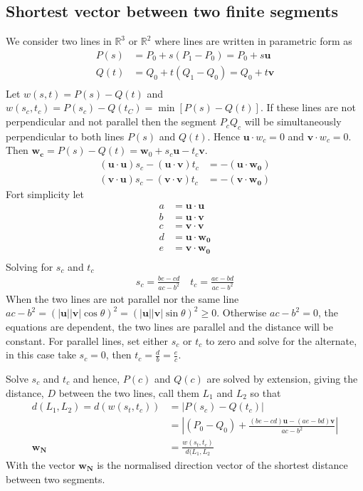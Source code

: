 \subsection{Shortest vector between two finite segments}
We consider two lines in $\mathbb{R}^3$ or $\mathbb{R}^2$ where lines are written in parametric form as
\begin{align}
    P(s) &= P_0+s(P_1-P_0) = P_0 + s\mathbf{u} \\
    Q(t) &= Q_0+t(Q_1-Q_0) = Q_0 + t\mathbf{v} \\
\end{align}
Let $w(s,t)= P(s)-Q(t)$ and $w(s_c,t_c)=P(s_c)-Q(t_C) = \min \left[ P(s)-Q(t) \right]$. If these lines are not perpendicular and not parallel then the segment $P_cQ_c$ will be simultaneously perpendicular to both lines $P(s)$ and $Q(t)$. Hence $\mathbf{u}\cdot w_c = 0$ and $\mathbf{v}\cdot w_c = 0$. Then $\mathbf{w_c} = P(s)-Q(t)=\mathbf{w}_0+s_c\mathbf{u}-t_c\mathbf{v}$. 
\begin{align}
    (\mathbf{u}\cdot\mathbf{u})s_c-(\mathbf{u}\cdot\mathbf{v})t_c &= -(\mathbf{u}\cdot\mathbf{w_0}) \\
    (\mathbf{v}\cdot\mathbf{u})s_c-(\mathbf{v}\cdot\mathbf{v})t_c &= -(\mathbf{v}\cdot\mathbf{w_0})
\end{align}
Fort simplicity let 
\begin{align}
    a & = \mathbf{u}\cdot\mathbf{u} \\
    b & = \mathbf{u}\cdot\mathbf{v} \\
    c & = \mathbf{v}\cdot\mathbf{v} \\
    d & = \mathbf{u}\cdot\mathbf{w_0} \\
    e & = \mathbf{v}\cdot\mathbf{w_0} \\
\end{align}
Solving for $s_c$ and $t_c$
\begin{align}
    s_c = \frac{be-cd}{ac-b^2} \quad t_c = \frac{ae-bd}{ac-b^2} 
\end{align}
When the two lines are not parallel nor the same line $ac-b^2 = \left(|\mathbf{u}||\mathbf{v}|\cos\theta\right)^2 = \left(|\mathbf{u}||\mathbf{v}|\sin\theta\right)^2 \geq 0$. Otherwise $ac-b^2=0$, the equations are dependent, the two lines are parallel and the distance will be constant. For parallel lines, set either $s_c$ or $t_c$ to zero and solve for the alternate, in this case take $s_c=0$, then $t_c = \frac{d}{b}=\frac{e}{c}$. 

Solve $s_c$ and $t_c$ and hence, $P(c)$ and $Q(c)$ are solved by extension, giving the distance, $D$ between the two lines, call them $L_1$ and $L_2$ so that
\begin{align}
    d(L_1,L_2) = d(w(s_t,t_c))      & = \left | P(s_c)-Q(t_c) \right | \\
                                    & = \left | (P_0-Q_0)+\frac{(be-cd)\mathbf{u}-(ae-bd)\mathbf{v}}{ac-b^2} \right| \\
                    \mathbf{w_N}    & = \frac{w(s_t,t_c)}{d(L_1,L_2}            
\end{align}
With the vector $\mathbf{w_N}$ is the normalised direction vector of the shortest distance between two segments.
